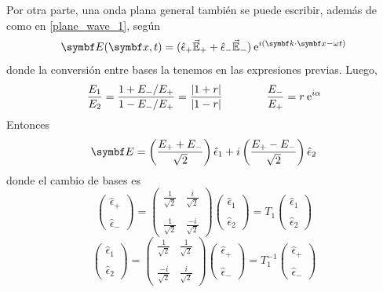 \documentclass[10pt,oneside]{CBFT_book}
\begin{document}
Por otra parte, una onda plana general también se puede escribir, además de como en
\eqref{plane_wave_1}, según
\[
	\vb{E}( \vb{x},t )=(\hat{\epsilon}_+ \vec{\mathbb{E}}_+ + 
			\hat{\epsilon}_-\vec{\mathbb{E}}_-) \euler^{i( \pe{k}{x} -\omega t)}
\]
donde la conversión entre bases la tenemos en las expresiones previas. Luego,
\[
	\frac{E_1}{E_2} = \frac{1 + E_-/E_+}{1 - E_-/E_+} =\frac{|1+r|}{|1-r|} \qquad \qquad 
	\frac{E_-}{E_+} = r \:\mathrm{e}^{i\alpha}
\]
Entonces
\[
	\vb{E} = \Frac{E_+ + E_-}{\sqrt{2}} \hat{\epsilon}_1 + 
	i \Frac{ E_+ - E_- }{\sqrt{2}}\hat{\epsilon}_2
\]
donde el cambio de bases es
\[
	\begin{pmatrix}
	\hat{\epsilon}_+ \\
	\\
	\hat{\epsilon}_-
	\end{pmatrix} =
	\begin{pmatrix}
	\frac{1}{\sqrt{2}} & \frac{i}{\sqrt{2}} \\
	\\
	\frac{1}{\sqrt{2}} & \frac{-i}{\sqrt{2}}
	\end{pmatrix}
	\begin{pmatrix}
	\hat{\epsilon}_1 \\
	\\
	\hat{\epsilon}_2
	\end{pmatrix} =
	T_1 
	\begin{pmatrix}
	\hat{\epsilon}_1 \\
	\\
	\hat{\epsilon}_2
	\end{pmatrix}
\]
\[
	\begin{pmatrix}
	\hat{\epsilon}_1 \\
	\\
	\hat{\epsilon}_2
	\end{pmatrix} =
	\begin{pmatrix}
	\frac{1}{\sqrt{2}} & \frac{1}{\sqrt{2}} \\
	\\
	\frac{-i}{\sqrt{2}} & \frac{i}{\sqrt{2}}
	\end{pmatrix}
	\begin{pmatrix}
	\hat{\epsilon}_+ \\
	\\
	\hat{\epsilon}_-
	\end{pmatrix} =
	T_1^{-1} 
	\begin{pmatrix}
	\hat{\epsilon}_+ \\
	\\
	\hat{\epsilon}_-
	\end{pmatrix}
\]
\end{document}
